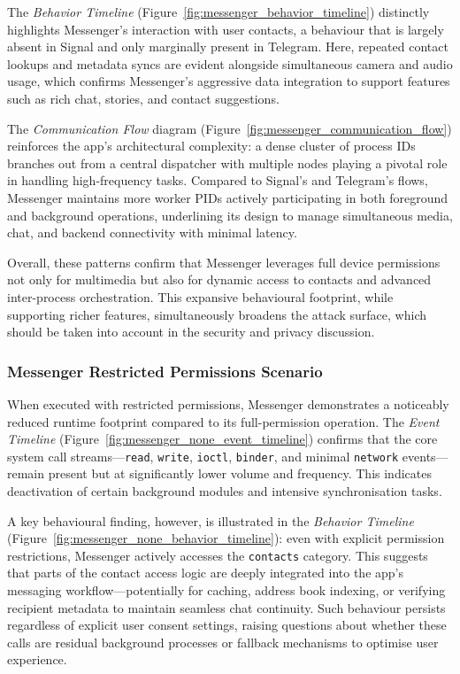 \documentclass[a4paper,12pt]{report}
\begin{document}
The \textit{Behavior Timeline} (Figure~\ref{fig:messenger_behavior_timeline}) distinctly highlights Messenger’s interaction with user contacts, a behaviour that is largely absent in Signal and only marginally present in Telegram. Here, repeated contact lookups and metadata syncs are evident alongside simultaneous camera and audio usage, which confirms Messenger’s aggressive data integration to support features such as rich chat, stories, and contact suggestions.

The \textit{Communication Flow} diagram (Figure~\ref{fig:messenger_communication_flow}) reinforces the app’s architectural complexity: a dense cluster of process IDs branches out from a central dispatcher with multiple nodes playing a pivotal role in handling high-frequency tasks. Compared to Signal’s and Telegram’s flows, Messenger maintains more worker PIDs actively participating in both foreground and background operations, underlining its design to manage simultaneous media, chat, and backend connectivity with minimal latency.

Overall, these patterns confirm that Messenger leverages full device permissions not only for multimedia but also for dynamic access to contacts and advanced inter-process orchestration. This expansive behavioural footprint, while supporting richer features, simultaneously broadens the attack surface, which should be taken into account in the security and privacy discussion.


\subsubsection{Messenger Restricted Permissions Scenario}

When executed with restricted permissions, Messenger demonstrates a noticeably reduced runtime footprint compared to its full-permission operation. The \textit{Event Timeline} (Figure~\ref{fig:messenger_none_event_timeline}) confirms that the core system call streams—\texttt{read}, \texttt{write}, \texttt{ioctl}, \texttt{binder}, and minimal \texttt{network} events—remain present but at significantly lower volume and frequency. This indicates deactivation of certain background modules and intensive synchronisation tasks.

A key behavioural finding, however, is illustrated in the \textit{Behavior Timeline} (Figure~\ref{fig:messenger_none_behavior_timeline}): even with explicit permission restrictions, Messenger actively accesses the \texttt{contacts} category. This suggests that parts of the contact access logic are deeply integrated into the app’s messaging workflow—potentially for caching, address book indexing, or verifying recipient metadata to maintain seamless chat continuity. Such behaviour persists regardless of explicit user consent settings, raising questions about whether these calls are residual background processes or fallback mechanisms to optimise user experience.
\end{document}
